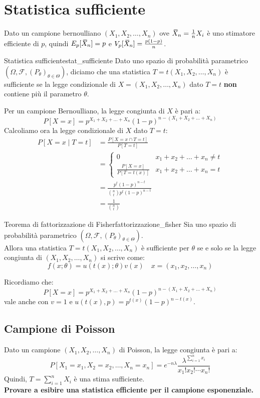\documentclass[12pt]{report}
\newcounter{theorem}
\newcounter{definition}
\newcommand{\nmu}{}
\newcommand{\wbar}[1]{%
	\accentset{\mbox{\rule{0.55em}{0.5pt}}}{#1}%
}
\begin{document}
 		\section{Statistica sufficiente}
 		Dato un campione bernoulliano $(X_1, X_2, \dots, X_n)$ ove $\wbar{X}_n = \frac{1}{n}X_i$ è uno stimatore efficiente di $p$, quindi $E_p[\wbar{X}_n] = p$ e $V_p[\wbar{X}_n] = \frac{p(1-p)}{n}$. \\
 		\begin{definition}{\nmu Statistica sufficiente}{stat_sufficiente}
 			Dato uno spazio di probabilità parametrico $(\Omega, \mathcal{F}, (P_\theta)_{\theta \in \Theta})$, diciamo che una statistica $T = t(X_1, X_2, \dots, X_n)$ è sufficiente se la legge condizionale di $X = (X_1, X_2, \dots, X_n)$ dato $T=t$ \textbf{non} contiene più il parametro $\theta$.
 		\end{definition}
 		Per un campione Bernoulliano, la legge congiunta di $X$ è pari a:
 		\[
 		P[X = x] = p^{X_1 + X_2 + \dots + X_n} (1-p)^{n - (X_1 + X_2 + \dots + X_n)}
 		\]
 		Calcoliamo ora la legge condizionale di $X$ dato $T = t$:
 		\begin{align*}
 			P[X = x \mid T = t] &= \frac{P[X = x \cap T = t]}{P[T = t]} \\
 			 &= \begin{cases}
 				0 & x_1 + x_2 + \dots + x_n \neq t \\
 				\frac{P[X = x]}{P[T = t(x)]}& x_1 + x_2 + \dots + x_n = t
 			\end{cases} \\
 			&= \frac{p^{t}(1-p)^{n - t}}{\binom{n}{t}p^t(1-p)^{n-t}} \\
 			&= \frac{1}{\binom{n}{t}}
 		\end{align*}
 		\begin{theorem}{\nmu Teorema di fattorizzazione di Fisher}{fattorizzazione_fisher}
 			Sia uno spazio di probabilità parametrico $(\Omega, \mathcal{F}, (P_\theta)_{\theta \in \Theta})$. \\
 			Allora una statistica $T = t(X_1, X_2, \dots, X_n)$ è sufficiente per $\theta$ se e solo se la legge congiunta di $(X_1, X_2, \dots, X_n)$ si scrive come:
 			\[
 			f(x; \theta) = u(t(x); \theta)v(x) \quad x = (x_1, x_2, \dots, x_n)
 			\]
 		\end{theorem}
 		Ricordiamo che:
 		\[
 			P[X = x] = p^{X_1 + X_2 + \dots + X_n} (1-p)^{n - (X_1 + X_2 + \dots + X_n)}
 		\]
 		vale anche con $v=1$ e $u(t(x), p) = p^{t(x)}(1-p)^{n-t(x)}$. \\
 		\subsection{Campione di Poisson}
 		Dato un campione $(X_1, X_2, \dots, X_n)$ di Poisson, la legge congiunta è pari a:
 		\[
 		P[X_1 = x_1, X_2 = x_2, \dots, X_n=x_n] = e^{-n\lambda}\frac{\lambda^{\sum_{i=1}^{n}x_i}}{x_1!x_2!\cdots x_n!}
 		\]
 		Quindi, $T = \sum_{i=1}^{n}X_i$ è una stima sufficiente. \\
 		\textbf{Provare a esibire una statistica efficiente per il campione esponenziale.}
\end{document}
